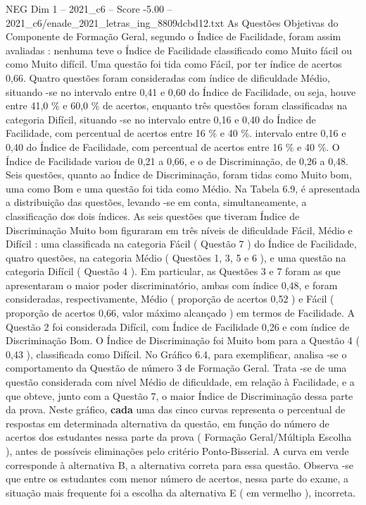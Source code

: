 \begin{textsample}{NEG Dim 1 – 2021\_c6 – Score -5.00 – 2021\_c6/enade\_2021\_letras\_ing\_8809dcbd12.txt}
As Questões Objetivas do Componente de Formação Geral, segundo o Índice de Facilidade, foram assim avaliadas : nenhuma teve o Índice de Facilidade classificado como Muito fácil ou como Muito difícil.
Uma questão foi tida como Fácil, por ter índice de acertos 0,66.
Quatro questões foram consideradas com índice de dificuldade Médio, situando -se no intervalo entre 0,41 e 0,60 do Índice de Facilidade, ou seja, houve entre 41,0 \% e 60,0 \% de acertos, enquanto três questões foram classificadas na categoria Difícil, situando -se no intervalo entre 0,16 e 0,40 do Índice de Facilidade, com percentual de acertos entre 16 \% e 40 \%. intervalo entre 0,16 e 0,40 do Índice de Facilidade, com percentual de acertos entre 16 \% e 40 \%.
O Índice de Facilidade variou de 0,21 a 0,66, e o de Discriminação, de 0,26 a 0,48.
Seis questões, quanto ao Índice de Discriminação, foram tidas como Muito bom, uma como Bom e uma questão foi tida como Médio.
Na Tabela 6.9, é apresentada a distribuição das questões, levando -se em conta, simultaneamente, a classificação dos dois índices.
As seis questões que tiveram Índice de Discriminação Muito bom figuraram em três níveis de dificuldade Fácil, Médio e Difícil : uma classificada na categoria Fácil ( Questão 7 ) do Índice de Facilidade, quatro questões, na categoria Médio ( Questões 1, 3, 5 e 6 ), e uma questão na categoria Difícil ( Questão 4 ).
Em particular, as Questões 3 e 7 foram as que apresentaram o maior poder discriminatório, ambas com índice 0,48, e foram consideradas, respectivamente, Médio ( proporção de acertos 0,52 ) e Fácil ( proporção de acertos 0,66, valor máximo alcançado ) em termos de Facilidade.
A Questão 2 foi considerada Difícil, com Índice de Facilidade 0,26 e com índice de Discriminação Bom.
O Índice de Discriminação foi Muito bom para a Questão 4 ( 0,43 ), classificada como Difícil.
No Gráfico 6.4, para exemplificar, analisa -se o comportamento da Questão de número 3 de Formação Geral.
Trata -se de uma questão considerada com nível Médio de dificuldade, em relação à Facilidade, e a que obteve, junto com a Questão 7, o maior Índice de Discriminação dessa parte da prova.
Neste gráfico, \textbf{cada} uma das cinco curvas representa o percentual de respostas em determinada alternativa da questão, em função do número de acertos dos estudantes nessa parte da prova ( Formação Geral/Múltipla Escolha ), antes de possíveis eliminações pelo critério Ponto-Bisserial.
A curva em verde corresponde à alternativa B, a alternativa correta para essa questão.
Observa -se que entre os estudantes com menor número de acertos, nessa parte do exame, a situação mais frequente foi a escolha da alternativa E ( em vermelho ), incorreta.

\end{textsample}
